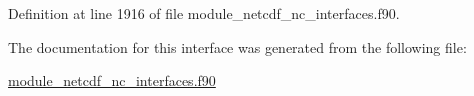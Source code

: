 Definition at line 1916 of file module\+\_\+netcdf\+\_\+nc\+\_\+interfaces.\+f90.



The documentation for this interface was generated from the following file\+:\begin{DoxyCompactItemize}
\item 
\hyperlink{module__netcdf__nc__interfaces_8f90}{module\+\_\+netcdf\+\_\+nc\+\_\+interfaces.\+f90}\end{DoxyCompactItemize}
